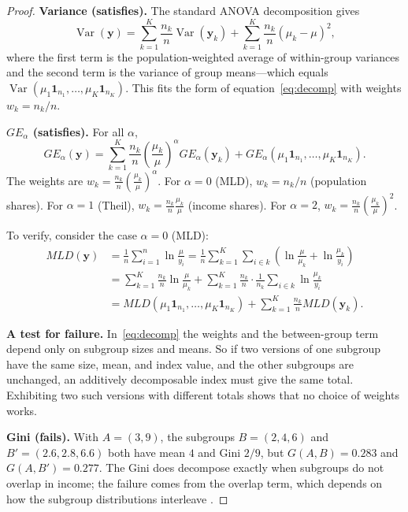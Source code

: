 \documentclass[12pt]{article}
\theoremstyle{plain}
\theoremstyle{definition}
\theoremstyle{remark}
\newcommand{\bfy}{\mathbf{y}}
\newcommand{\bfone}{\mathbf{1}}
\begin{document}
\begin{proof}
\textbf{Variance (satisfies).}
The standard ANOVA decomposition gives
\begin{equation}\label{eq:var_decomp}
\operatorname{Var}(\bfy) = \sum_{k=1}^K \frac{n_k}{n}\operatorname{Var}(\bfy_k) + \sum_{k=1}^K \frac{n_k}{n}(\mu_k - \mu)^2,
\end{equation}
where the first term is the population-weighted average of within-group variances and the second term is the variance of group means---which equals $\operatorname{Var}(\mu_1\bfone_{n_1}, \ldots, \mu_K\bfone_{n_K})$.
This fits the form of equation~\eqref{eq:decomp} with weights $w_k = n_k/n$.

\textbf{$GE_\alpha$ (satisfies).}
For all $\alpha$,
\begin{equation}\label{eq:ge_decomp}
GE_\alpha(\bfy) = \sum_{k=1}^K \frac{n_k}{n}\left(\frac{\mu_k}{\mu}\right)^\alpha GE_\alpha(\bfy_k) + GE_\alpha(\mu_1\bfone_{n_1}, \ldots, \mu_K\bfone_{n_K}).
\end{equation}
The weights are $w_k = \frac{n_k}{n}\left(\frac{\mu_k}{\mu}\right)^\alpha$.
For $\alpha = 0$ (MLD), $w_k = n_k/n$ (population shares).
For $\alpha = 1$ (Theil), $w_k = \frac{n_k}{n}\frac{\mu_k}{\mu}$ (income shares).
For $\alpha = 2$, $w_k = \frac{n_k}{n}\left(\frac{\mu_k}{\mu}\right)^2$.

To verify, consider the case $\alpha = 0$ (MLD):
\begin{align}
MLD(\bfy) &= \frac{1}{n}\sum_{i=1}^n \ln\frac{\mu}{y_i} = \frac{1}{n}\sum_{k=1}^K \sum_{i \in k} \left(\ln\frac{\mu}{\mu_k} + \ln\frac{\mu_k}{y_i}\right) \nonumber\\
&= \sum_{k=1}^K \frac{n_k}{n}\ln\frac{\mu}{\mu_k} + \sum_{k=1}^K \frac{n_k}{n} \cdot \frac{1}{n_k}\sum_{i \in k}\ln\frac{\mu_k}{y_i} \nonumber\\
&= MLD(\mu_1\bfone_{n_1}, \ldots, \mu_K\bfone_{n_K}) + \sum_{k=1}^K \frac{n_k}{n} MLD(\bfy_k). \label{eq:mld_decomp}
\end{align}

\textbf{A test for failure.}
In~\eqref{eq:decomp} the weights and the between-group term depend only on subgroup sizes and means.
So if two versions of one subgroup have the same size, mean, and index value, and the other subgroups are unchanged, an additively decomposable index must give the same total.
Exhibiting two such versions with different totals shows that no choice of weights works.

\textbf{Gini (fails).}
With $A = (3, 9)$, the subgroups $B = (2, 4, 6)$ and $B' = (2.6, 2.8, 6.6)$ both have mean $4$ and Gini $2/9$, but $G(A, B) = 0.283$ and $G(A, B') = 0.277$.
The Gini does decompose exactly when subgroups do not overlap in income; the failure comes from the overlap term, which depends on how the subgroup distributions interleave \citep{Bhattacharya1967}.


\end{proof}
\end{document}
